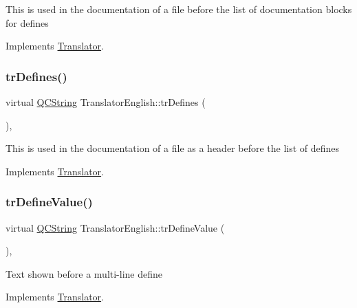This is used in the documentation of a file before the list of documentation blocks for defines 

Implements \mbox{\hyperlink{class_translator}{Translator}}.

\mbox{\label{class_translator_english_a5bbf9cb2eb019b28896f2dcf8813b8f6}} 
\subsubsection{\texorpdfstring{trDefines()}{trDefines()}}
{\footnotesize\ttfamily virtual \mbox{\hyperlink{class_q_c_string}{Q\+C\+String}} Translator\+English\+::tr\+Defines (\begin{DoxyParamCaption}{ }\end{DoxyParamCaption})\hspace{0.3cm}{\ttfamily [inline]}, {\ttfamily [virtual]}}

This is used in the documentation of a file as a header before the list of defines 

Implements \mbox{\hyperlink{class_translator}{Translator}}.

\mbox{\label{class_translator_english_a8e0565f7e9d4fb2663aba6ceb054a1f2}} 
\subsubsection{\texorpdfstring{trDefineValue()}{trDefineValue()}}
{\footnotesize\ttfamily virtual \mbox{\hyperlink{class_q_c_string}{Q\+C\+String}} Translator\+English\+::tr\+Define\+Value (\begin{DoxyParamCaption}{ }\end{DoxyParamCaption})\hspace{0.3cm}{\ttfamily [inline]}, {\ttfamily [virtual]}}

Text shown before a multi-\/line define 

Implements \mbox{\hyperlink{class_translator}{Translator}}.

\mbox{\label{class_translator_english_a6642a63b175adfdc60d1132ca42b9b03}} 
